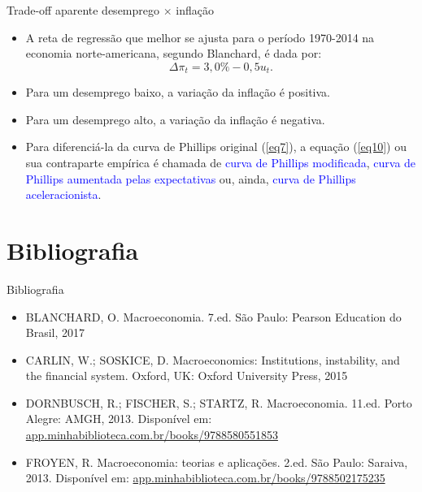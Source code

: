 \documentclass[10pt]{beamer}
\begin{document}
\begin{frame}{Trade-off aparente desemprego $\times$ inflação}
    \begin{itemize}
        \item A reta de regressão que melhor se ajusta para o período 1970-2014 na economia norte-americana, segundo Blanchard, é dada por:
        \[
        \Delta \pi_t = 3,0\% - 0,5 u_t.
        \]
        \bigskip
        \item Para um desemprego baixo, a variação da inflação é positiva.
        \bigskip
        \item Para um desemprego alto, a variação da inflação é negativa.
        \bigskip
        \item Para diferenciá-la da curva de Phillips original (\ref{eq7}), a equação (\ref{eq10}) ou sua contraparte empírica é chamada de \textcolor{blue}{curva de Phillips modificada}, \textcolor{blue}{curva de Phillips aumentada pelas expectativas} ou, ainda, \textcolor{blue}{curva de Phillips aceleracionista}.
    \end{itemize}
\end{frame}

\section{Bibliografia}
\begin{frame}{ Bibliografia}
    \begin{itemize}                
        \item BLANCHARD, O. Macroeconomia. 7.ed. São Paulo: Pearson Education do Brasil, 2017\medskip                
        \item CARLIN, W.; SOSKICE, D. Macroeconomics: Institutions, instability, and the financial system. Oxford, UK: Oxford University Press, 2015\medskip        
        \item DORNBUSCH, R.; FISCHER, S.; STARTZ, R. Macroeconomia. 11.ed. Porto Alegre: AMGH, 2013. Disponível em: \href{https://app.minhabiblioteca.com.br/books/9788580551853}{app.minhabiblioteca.com.br/books/9788580551853}\medskip
        \item FROYEN, R. Macroeconomia: teorias e aplicações. 2.ed. São Paulo: Saraiva, 2013. Disponível em: \href{https://app.minhabiblioteca.com.br/books/9788502175235}{app.minhabiblioteca.com.br/books/9788502175235}        
    \end{itemize}
\end{frame}
\end{document}
